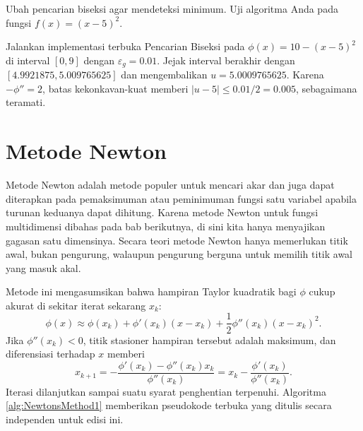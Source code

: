 \begin{exercise} Ubah pencarian biseksi agar mendeteksi minimum. Uji algoritma Anda pada fungsi $f(x)=(x-5)^2$.
\end{exercise}

\begin{example} Jalankan implementasi terbuka Pencarian Biseksi pada $\phi(x)=10-(x-5)^2$ di interval $[0,9]$ dengan $\varepsilon_g=0.01$. Jejak interval berakhir dengan $[4.9921875,5.009765625]$ dan mengembalikan $u=5.0009765625$. Karena $-\phi''=2$, batas kekonkavan-kuat memberi $|u-5|\leq0.01/2=0.005$, sebagaimana teramati.
\end{example}

\section{Metode Newton}
\begin{remark} Metode Newton adalah metode populer untuk mencari akar dan juga dapat diterapkan pada pemaksimuman atau peminimuman fungsi satu variabel apabila turunan keduanya dapat dihitung. Karena metode Newton untuk fungsi multidimensi dibahas pada bab berikutnya, di sini kita hanya menyajikan gagasan satu dimensinya. Secara teori metode Newton hanya memerlukan titik awal, bukan pengurung, walaupun pengurung berguna untuk memilih titik awal yang masuk akal.
\end{remark}

\begin{remark} Metode ini mengasumsikan bahwa hampiran Taylor kuadratik bagi $\phi$ cukup akurat di sekitar iterat sekarang $x_k$:
\begin{equation}
\phi(x)\approx\phi(x_k)+\phi'(x_k)(x-x_k)+\frac{1}{2}\phi''(x_k)(x-x_k)^2.
\end{equation}
Jika $\phi''(x_k)<0$, titik stasioner hampiran tersebut adalah maksimum, dan diferensiasi terhadap $x$ memberi
\begin{equation}
x_{k+1}=-\frac{\phi'(x_k)-\phi''(x_k)x_k}{\phi''(x_k)}=x_k-\frac{\phi'(x_k)}{\phi''(x_k)}.
\end{equation}
Iterasi dilanjutkan sampai suatu syarat penghentian terpenuhi. Algoritma \ref{alg:NewtonsMethod1} memberikan pseudokode terbuka yang ditulis secara independen untuk edisi ini.
\end{remark}


